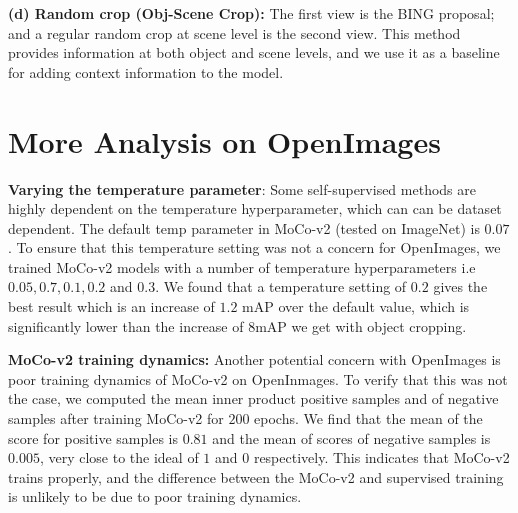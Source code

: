 
\textbf{(d) Random crop (Obj-Scene Crop):} The first view is the BING proposal; and a regular random crop at scene level is the second view. This method provides information at both object and scene levels, and we use it as a baseline for adding context information to the model. 

\section{More Analysis on OpenImages}
\label{sec:analysis_openimages_more}
\textbf{Varying the temperature parameter}: 
Some self-supervised methods are highly dependent on the temperature hyperparameter, which can can be dataset dependent. The default temp parameter in MoCo-v2 \citep{chen2020improved} (tested on ImageNet) is $0.07$. To ensure that this temperature setting was not a concern for OpenImages, we trained MoCo-v2 models with a number of temperature hyperparameters i.e $0.05, 0.7, 0.1, 0.2$ and $0.3$. We found that a temperature setting of $0.2$ gives the best result which is an increase of $1.2$ mAP over the default value, which is significantly lower than the increase of $8$mAP we get with object cropping. 

\textbf{MoCo-v2 training dynamics:} 
Another potential concern with OpenImages is poor training dynamics of MoCo-v2 on OpenInmages. To verify that this was not the case, we computed the mean inner product positive samples and of negative samples after training MoCo-v2 for $200$ epochs. We find that the mean of the score for positive samples is $0.81$ and the mean of scores of negative samples is $0.005$, very close to the ideal of $1$ and $0$ respectively. This indicates that MoCo-v2 trains properly, and the difference between the MoCo-v2 and supervised training is unlikely to be due to poor training dynamics. 

